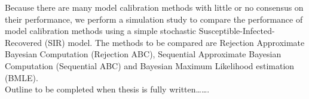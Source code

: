 Because there are many model calibration methods with little or no consensus on their performance, we perform a simulation study to compare the performance of model calibration methods using a simple stochastic Susceptible-Infected-Recovered (SIR) model. The methods to be compared are Rejection Approximate Bayesian Computation (Rejection ABC), Sequential Approximate Bayesian Computation (Sequential ABC) and Bayesian Maximum Likelihood estimation (BMLE).\\

Outline to be completed when thesis is fully written…….

